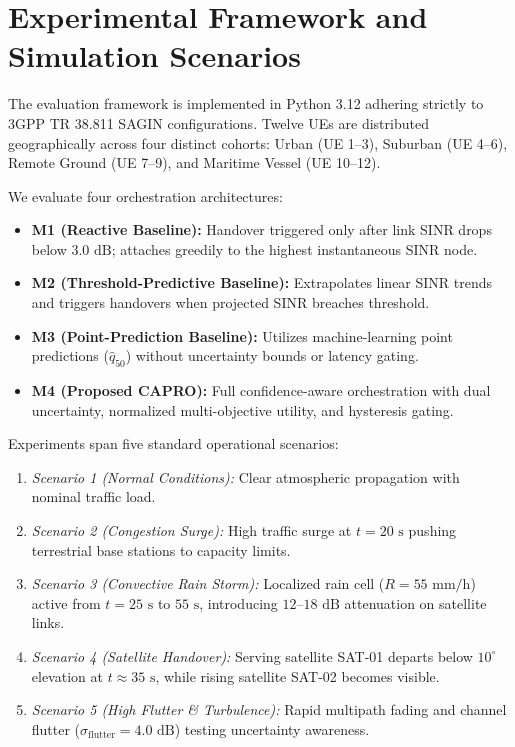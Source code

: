 \documentclass[conference]{IEEEtran}
\begin{document}
\section{Experimental Framework and Simulation Scenarios}
\label{sec:experiments}

The evaluation framework is implemented in Python 3.12 adhering strictly to 3GPP TR 38.811 SAGIN configurations. Twelve UEs are distributed geographically across four distinct cohorts: Urban (UE 1--3), Suburban (UE 4--6), Remote Ground (UE 7--9), and Maritime Vessel (UE 10--12).

We evaluate four orchestration architectures:
\begin{itemize}
    \item \textbf{M1 (Reactive Baseline):} Handover triggered only after link SINR drops below $3.0\text{ dB}$; attaches greedily to the highest instantaneous SINR node.
    \item \textbf{M2 (Threshold-Predictive Baseline):} Extrapolates linear SINR trends and triggers handovers when projected SINR breaches threshold.
    \item \textbf{M3 (Point-Prediction Baseline):} Utilizes machine-learning point predictions ($\hat{q}_{50}$) without uncertainty bounds or latency gating.
    \item \textbf{M4 (Proposed CAPRO):} Full confidence-aware orchestration with dual uncertainty, normalized multi-objective utility, and hysteresis gating.
\end{itemize}

Experiments span five standard operational scenarios:
\begin{enumerate}
    \item \textit{Scenario 1 (Normal Conditions):} Clear atmospheric propagation with nominal traffic load.
    \item \textit{Scenario 2 (Congestion Surge):} High traffic surge at $t = 20\text{ s}$ pushing terrestrial base stations to capacity limits.
    \item \textit{Scenario 3 (Convective Rain Storm):} Localized rain cell ($R = 55\text{ mm/h}$) active from $t = 25\text{ s}$ to $55\text{ s}$, introducing $12\text{--}18\text{ dB}$ attenuation on satellite links.
    \item \textit{Scenario 4 (Satellite Handover):} Serving satellite SAT-01 departs below $10^\circ$ elevation at $t \approx 35\text{ s}$, while rising satellite SAT-02 becomes visible.
    \item \textit{Scenario 5 (High Flutter \& Turbulence):} Rapid multipath fading and channel flutter ($\sigma_{\text{flutter}} = 4.0\text{ dB}$) testing uncertainty awareness.
\end{enumerate}
\end{document}

